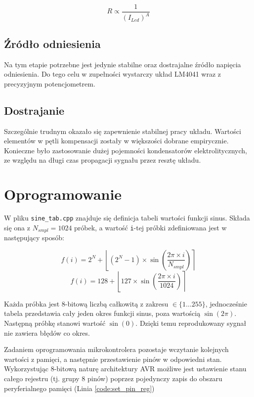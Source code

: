 \documentclass[12pt, a4paper]{article}
\begin{document}
\begin{equation}
	R \propto \frac{1}{(I_{Led})^A}
\end{equation}

\subsection{Źródło odniesienia}
Na tym etapie potrzebne jest jedynie stabilne oraz dostrajalne źródło napięcia odniesienia.
Do tego celu w zupełności wystarczy układ LM4041 wraz z precyzyjnym potencjometrem.

\subsection{Dostrajanie}
Szczególnie trudnym okazało się zapewnienie stabilnej pracy układu. 
Wartości elementów w pętli kompensacji zostały w większości dobrane empirycznie.
Konieczne było zastosowanie dużej pojemności kondensatorów elektrolitycznych, 
ze względu na długi czas propagacji sygnału przez resztę układu.

\newpage

\section{Oprogramowanie}
\label{sec:impl}
W pliku \verb|sine_tab.cpp| znajduje się definicja tabeli wartości funkcji sinus. Składa się ona z $N_{smpl}=1024$ próbek, a wartość \verb|i|-tej próbki 
zdefiniowana jest w następujący sposób:

\begin{equation}
	f(i) = 2^N + \left\lfloor (2^N - 1) \times \sin \left(\frac{2 \pi \times i}{N_{smpl}}\right)\right\rceil
\end{equation}
\begin{equation}
	f(i) = 128 + \left\lfloor 127 \times \sin \left(\frac{2 \pi \times i}{1024}\right)\right\rceil
\end{equation}

Każda próbka jest 8-bitową liczbą całkowitą z zakresu $\in \{1 \dots 255\}$, jednocześnie tabela przedstawia cały jeden okres funkcji sinus,
poza wartością $\sin (2 \pi)$. Następną próbkę stanowi wartość $\sin (0)$. Dzięki temu reprodukowany sygnał nie zawiera błędów co okres.

Zadaniem oprogramowania mikrokontrolera pozostaje wczytanie kolejnych wartości z pamięci,
a następnie przestawienie pinów w odpowiedni stan. Wykorzystując 8-bitową naturę architektury AVR
możliwe jest ustawienie stanu całego rejestru (tj. grupy 8 pinów) poprzez pojedynczy zapis do 
obszaru peryferialnego pamięci (Linia \ref{code:set_pin_reg})
\end{document}
